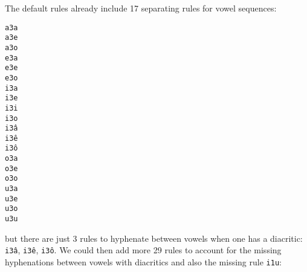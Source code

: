 The default rules already include 17 separating rules for vowel sequences:
\begin{multicols}{5}
\setlength{\columnsep}{0pt}
\setlength{\parindent}{0pt}
\texttt{a3a \\ a3e \\ a3o \\ e3a \\ e3e \\ e3o \\ i3a \\ i3e \\ i3i \\ i3o \\ i3â \\ i3ê \\ i3ô \\ o3a \\ o3e \\ o3o \\ u3a \\ u3e \\ u3o \\ u3u}
\end{multicols}
but there are just 3 rules to hyphenate between vowels when one has a diacritic: \texttt{i3â}, \texttt{i3ê}, \texttt{i3ô}.
We could then add more 29 rules to account for the missing hyphenations between vowels with diacritics and also the
missing rule \texttt{i1u}:
